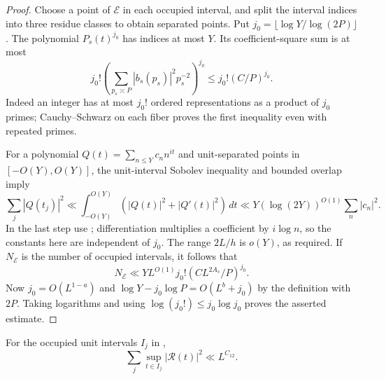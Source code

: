 \begin{proof}
Choose a point of $\mathcal E$ in each occupied interval, and split
the interval indices into three residue classes to obtain separated
points. Put $j_0=\lfloor\log Y/\log(2P)\rfloor$. The polynomial
$P_s(t)^{j_0}$ has indices at most $Y$. Its coefficient-square sum
is at most
\[
 j_0!\left(\sum_{p_s\asymp P}|b_s(p_s)|^2p_s^{-2}\right)^{j_0}
                  \leq j_0!(C/P)^{j_0}.
\]
Indeed an integer has at most $j_0!$ ordered representations as
a product of $j_0$ primes; Cauchy--Schwarz on each fiber proves
the first inequality even with repeated primes.

For a polynomial $Q(t)=\sum_{n\leq Y}c_nn^{it}$ and unit-separated
points in $[-O(Y),O(Y)]$, the unit-interval Sobolev inequality and
bounded overlap imply
\[
 \sum_j|Q(t_j)|^2\ll\int_{-O(Y)}^{O(Y)}(|Q(t)|^2+|Q'(t)|^2)\,dt
                  \ll Y(\log(2Y))^{O(1)}\sum_n|c_n|^2.
\]
In the last step use ; differentiation
multiplies a coefficient by $i\log n$, so the constants here are
independent of $j_0$. The range $2L/h$ is $o(Y)$, as required.
If $N_{\mathcal E}$ is the number of occupied intervals, it follows
that
\[
 N_{\mathcal E}\ll YL^{O(1)}j_0!
                   (CL^{2A_s}/P)^{j_0}.
\]
Now $j_0=O(L^{1-a})$ and
$\log Y-j_0\log P=O(L^b+j_0)$ by the definition with $2P$.
Taking logarithms and using $\log(j_0!)\leq j_0\log j_0$ proves
the asserted estimate.
\end{proof}

\begin{lemma}\label{lem:sparse-residual}
For the occupied unit intervals $I_j$ in
,
\[
             \sum_j\sup_{t\in I_j}|\mathcal R(t)|^2\ll L^{C_{12}}.
\]
\end{lemma}

